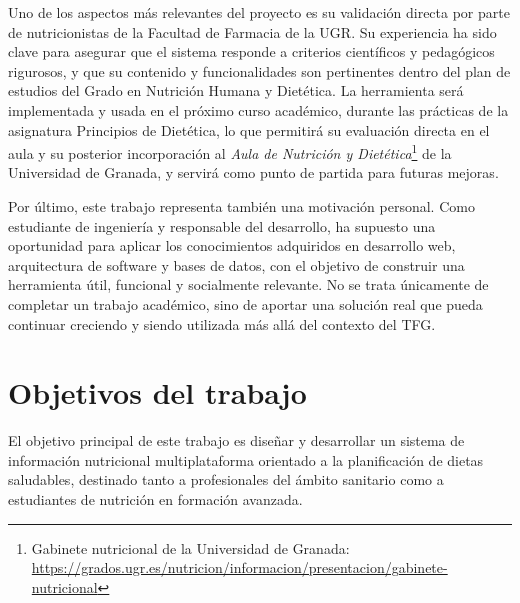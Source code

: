 Uno de los aspectos más relevantes del proyecto es su validación directa por parte de nutricionistas de la Facultad de Farmacia de la UGR. Su experiencia ha sido clave para asegurar que el sistema responde a criterios científicos y pedagógicos rigurosos, y que su contenido y funcionalidades son pertinentes dentro del plan de estudios del Grado en Nutrición Humana y Dietética. La herramienta será implementada y usada en el próximo curso académico, durante las prácticas de la asignatura Principios de Dietética, lo que permitirá su evaluación directa en el aula y su posterior incorporación al \textit{Aula de Nutrición y Dietética}\footnote{Gabinete nutricional de la Universidad de Granada: \url{https://grados.ugr.es/nutricion/informacion/presentacion/gabinete-nutricional}} de la Universidad de Granada, y servirá como punto de partida para futuras mejoras.

Por último, este trabajo representa también una motivación personal. Como estudiante de ingeniería y responsable del desarrollo, ha supuesto una oportunidad para aplicar los conocimientos adquiridos en desarrollo web, arquitectura de software y bases de datos, con el objetivo de construir una herramienta útil, funcional y socialmente relevante. No se trata únicamente de completar un trabajo académico, sino de aportar una solución real que pueda continuar creciendo y siendo utilizada más allá del contexto del TFG.





\section{Objetivos del trabajo}
El objetivo principal de este trabajo es diseñar y desarrollar un sistema de información nutricional multiplataforma orientado a la planificación de dietas saludables, destinado tanto a profesionales del ámbito sanitario como a estudiantes de nutrición en formación avanzada. 

